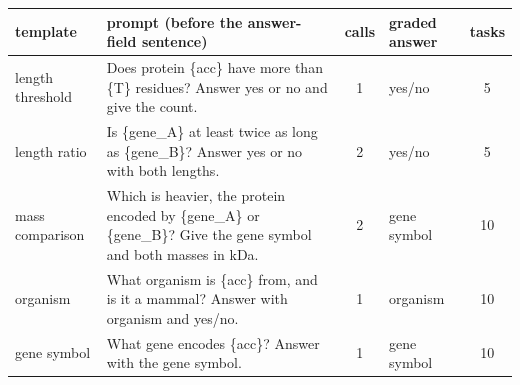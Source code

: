 \begin{tabular}{lp{7.6cm}clc}
\toprule
template & prompt (before the answer-field sentence) & calls & graded answer & tasks \\
\midrule
length threshold & Does protein \{acc\} have more than \{T\} residues? Answer yes or no and give the count. & 1 & yes/no & 5 \\
length ratio & Is \{gene\_A\} at least twice as long as \{gene\_B\}? Answer yes or no with both lengths. & 2 & yes/no & 5 \\
mass comparison & Which is heavier, the protein encoded by \{gene\_A\} or \{gene\_B\}? Give the gene symbol and both masses in kDa. & 2 & gene symbol & 10 \\
organism & What organism is \{acc\} from, and is it a mammal? Answer with organism and yes/no. & 1 & organism & 10 \\
gene symbol & What gene encodes \{acc\}? Answer with the gene symbol. & 1 & gene symbol & 10 \\
\bottomrule
\end{tabular}
